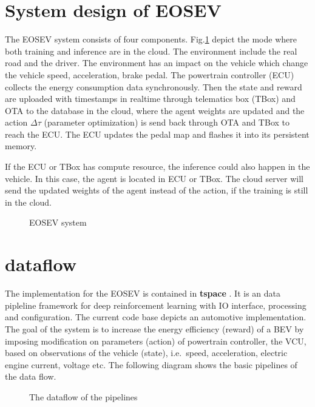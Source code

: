 \documentclass[conference]{IEEEtran}
\begin{document}
\begin{appendices}

	\section{System design of EOSEV}\label{sec:system design}

	The EOSEV system consists of four components. Fig.\@\ref{fig:EOSEV system} depict the mode where both training and inference are in the cloud. The environment include the real road and the driver. The environment has an impact on the vehicle which change the vehicle speed, acceleration, brake pedal. The powertrain controller (ECU) collects the energy consumption data synchronously. Then the state and reward are uploaded with timestamps in realtime through telematics box (TBox) and OTA to the database in the cloud, where the agent weights are updated and the action $\Delta\tau$ (parameter optimization) is send back through OTA and TBox to reach the ECU. The ECU updates the pedal map and flashes it into its persistent memory.

	If the ECU or TBox has compute resource, the inference could also happen in the vehicle. In this case, the agent is located in ECU or TBox. The cloud server will send the updated weights of the agent instead of the action, if the training is still in the cloud.

	\begin{figure}[ht]
		\centering
		\def\svgwidth{\columnwidth}
		
		\caption{\label{fig:veos} EOSEV system}\label{fig:EOSEV system}
	\end{figure}

	\section{dataflow}\label{sec:dataflow}

	The implementation for the EOSEV is contained in \textbf{tspace} \parencite{github:tspace}. It is an data pipleline framework for deep reinforcement learning with IO interface, processing and configuration. The current code base depicts an automotive implementation. The goal of the system is to increase the energy efficiency (reward) of a BEV by imposing modification on parameters (action) of powertrain controller, the VCU, based on observations of the vehicle (state), i.e.\ speed, acceleration, electric engine current, voltage etc. The following diagram shows the basic pipelines of the data flow.
	\begin{figure}[ht]
		\centering
		\def\svgwidth{\columnwidth}
		
		\caption{\label{fig:Software overview} The dataflow of the pipelines}
	\end{figure}
\end{appendices}
\end{document}
